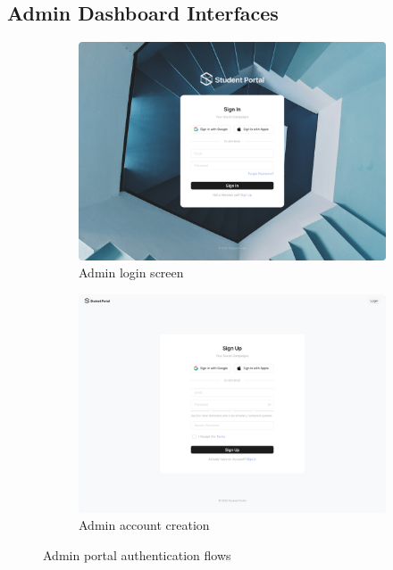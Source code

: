 \subsection{Admin Dashboard Interfaces}
\begin{figure}[H]
    \centering
    \begin{subfigure}{0.45\textwidth}
        \includegraphics[width=\textwidth]{latex-doc/images/web_interface/Authentication-Sign_In.jpg}
        \caption{Admin login screen}
        \label{fig:admin_login}
    \end{subfigure}
    \begin{subfigure}{0.45\textwidth}
        \includegraphics[width=\textwidth]{latex-doc/images/web_interface/Authentication-Sign_Up.jpg}
        \caption{Admin account creation}
        \label{fig:admin_signup}
    \end{subfigure}
    \caption{Admin portal authentication flows}
    \label{fig:admin_auth}
\end{figure}

